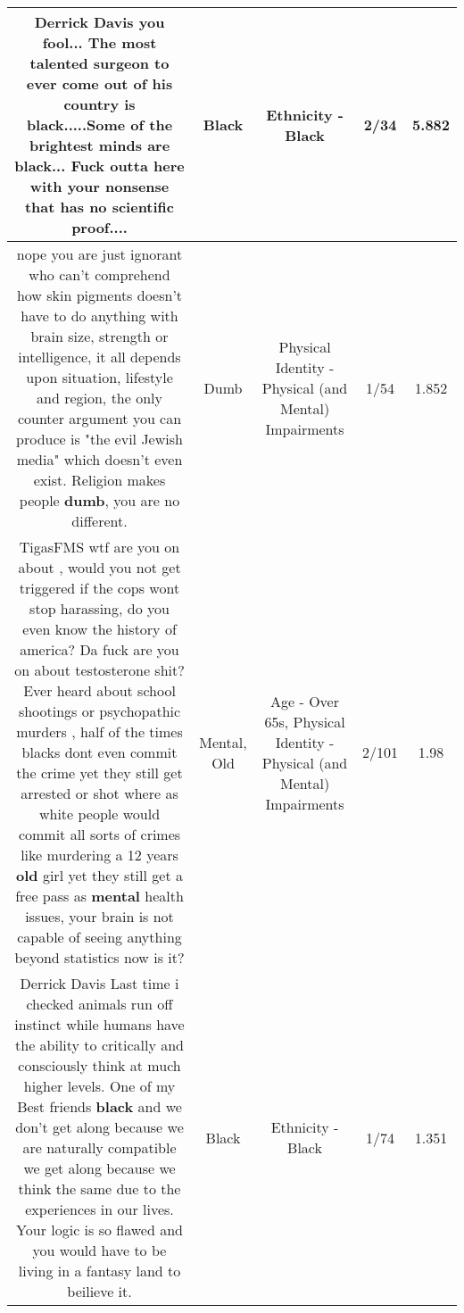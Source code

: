\documentclass[11pt]{article}
\newlength\mylength
\begin{document}
\begin{center}
\begin{longtable}{|C{.65\mylength}|C{.30\mylength}|C{.12\mylength}|C{.12\mylength}|C{.12\mylength}|}
  \small Derrick Davis you fool... The most talented surgeon to ever come out of his country is \textbf{black}.....Some of the brightest minds are \textbf{black}... Fuck outta here with your nonsense that has no scientific proof....\normalsize   & Black & Ethnicity - Black & 2/34 & 5.882 \\  \hline
  \small nope you are just ignorant who can't comprehend how skin pigments doesn't have to do anything with brain size, strength or intelligence, it all depends upon situation, lifestyle and region, the only counter argument you can produce is "the evil Jewish media" which doesn't even exist. Religion makes people \textbf{dumb}, you are no different.\normalsize   & Dumb & Physical Identity - Physical (and Mental) Impairments & 1/54 & 1.852 \\  \hline
  \small TigasFMS wtf are you on about , would you not get triggered if the cops wont stop harassing, do you even know the history of america? Da fuck are you on about testosterone shit? Ever heard about school shootings or psychopathic murders , half of the times blacks dont even commit the crime yet they still get arrested or shot where as white people would commit all sorts of crimes like murdering a 12 years \textbf{old} girl yet they still get a free pass as \textbf{mental} health issues, your brain is not capable of seeing anything beyond statistics now is it?\normalsize   & Mental, Old & Age - Over 65s, Physical Identity - Physical (and Mental) Impairments & 2/101 & 1.98 \\  \hline
  \small Derrick Davis Last time i checked animals run off instinct while humans have the ability to critically and consciously think at much higher levels. One of my Best friends \textbf{black} and we don't get along because we are naturally compatible we get along because we think the same due to the experiences in our lives. Your logic is so flawed and you would have to be living in a fantasy land to beilieve it.\normalsize   & Black & Ethnicity - Black & 1/74 & 1.351 \\  \hline

\end{longtable}
\end{center}
\end{document}
